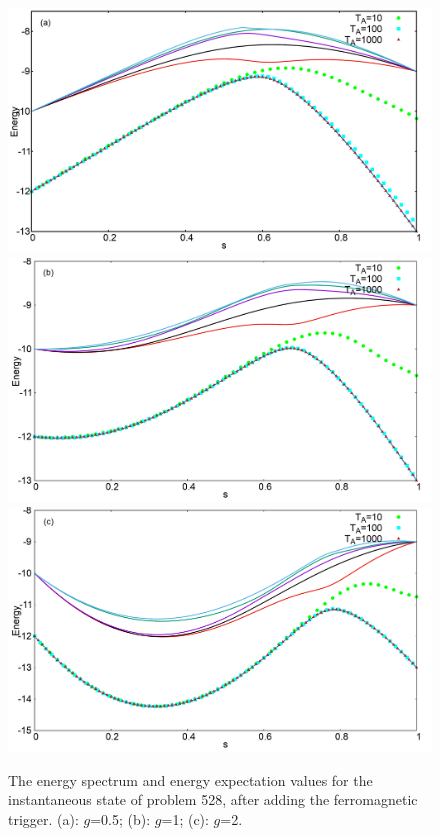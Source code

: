 \documentclass[../main.tex]{subfiles}
\begin{document}
\begin{figure}[H]
\centering 
\includegraphics[scale=0.24]{528_s12_F_g0.png}
\includegraphics[scale=0.24]{528_s12_F_g1.png}
\includegraphics[scale=0.24]{528_s12_F_g2.png}
\caption{The energy spectrum and energy expectation values for the instantaneous state of problem 528, after adding the ferromagnetic trigger. (a): $g$=0.5; (b): $g$=1; (c): $g$=2.}
\label{fig:f7}
\end{figure}
\end{document}
